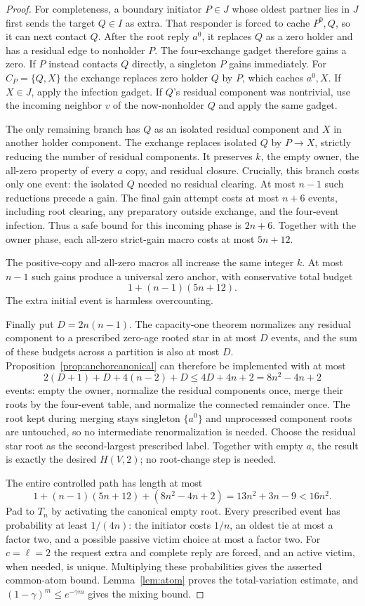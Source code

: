 \documentclass[11pt]{article}
\begin{document}
\begin{proof}
For completeness, a boundary initiator $P\in J$ whose
oldest partner lies in $J$ first sends the target
$Q\in I$ as extra. That responder is forced to cache
$P^0,Q$, so it can next contact $Q$.
After the root reply $a^0$, it replaces $Q$ as a zero
holder and has a residual edge to nonholder $P$.
The four-exchange gadget therefore gains a zero.
If $P$ instead contacts $Q$ directly, a singleton
$P$ gains immediately. For $C_P=\{Q,X\}$ the exchange
replaces zero holder $Q$ by $P$, which caches
$a^0,X$. If $X\in J$, apply the infection gadget.
If $Q$'s residual component was nontrivial, use the
incoming neighbor $v$ of the now-nonholder $Q$
and apply the same gadget.

The only remaining branch has $Q$ as an isolated
residual component and $X$ in another holder component.
The exchange replaces isolated $Q$ by $P\to X$,
strictly reducing the number of residual components.
It preserves $k$, the empty owner, the all-zero
property of every $a$ copy, and residual closure.
Crucially, this branch costs only one event:
the isolated $Q$ needed no residual clearing.
At most $n-1$ such reductions precede a gain.
The final gain attempt costs at most $n+6$ events,
including root clearing, any preparatory outside
exchange, and the four-event infection.
Thus a safe bound for this incoming phase is $2n+6$.
Together with the owner phase, each all-zero strict-gain
macro costs at most $5n+12$.

The positive-copy and all-zero macros all increase
the same integer $k$. At most $n-1$ such gains produce
a universal zero anchor, with conservative total
budget
\[
 1+(n-1)(5n+12).
\]
The extra initial event is harmless overcounting.

Finally put $D=2n(n-1)$. The capacity-one theorem
normalizes any residual component to a prescribed
zero-age rooted star in at most $D$ events, and the
sum of these budgets across a partition is also at
most $D$. Proposition~\ref{prop:anchorcanonical}
can therefore be implemented with at most
\[
 2(D+1)+D+4(n-2)+D
 \le 4D+4n+2=8n^2-4n+2
\]
events: empty the owner, normalize the residual
components once, merge their roots by the four-event
table, and normalize the connected remainder once.
The root kept during merging stays singleton
$\{a^0\}$ and unprocessed component roots are
untouched, so no intermediate renormalization is
needed. Choose the residual star root as the
second-largest prescribed label. Together with
empty $a$, the result is exactly the desired
$H(V,2)$; no root-change step is needed.

The entire controlled path has length at most
\[
 1+(n-1)(5n+12)+(8n^2-4n+2)
 =13n^2+3n-9<16n^2.
\]
Pad to $T_n$ by activating the canonical empty root.
Every prescribed event has probability at least
$1/(4n)$: the initiator costs $1/n$, an oldest tie
at most a factor two, and a possible passive victim
choice at most a factor two. For $c=\ell=2$ the
request extra and complete reply are forced, and
an active victim, when needed, is unique.
Multiplying these probabilities gives the asserted
common-atom bound. Lemma~\ref{lem:atom} proves the
total-variation estimate, and
$(1-\gamma)^m\le e^{-\gamma m}$ gives the mixing bound.
\end{proof}
\end{document}
